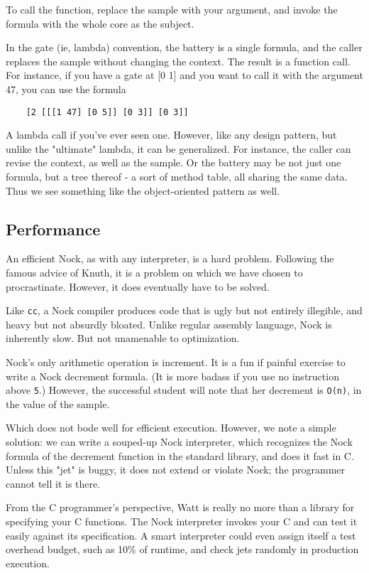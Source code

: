 \documentclass[10pt, nocopyrightspace]{sigplanconf}
\begin{document}
To call the function, replace the sample with your argument, and
invoke the formula with the whole core as the subject.

In the gate (ie, lambda) convention, the battery is a single
formula, and the caller replaces the sample without changing the
context.  The result is a function call.  For instance, if you
have a gate at [0 1] and you want to call it with the argument
47, you can use the formula
\begin{verbatim}
    [2 [[[1 47] [0 5]] [0 3]] [0 3]]
\end{verbatim}
A lambda call if you've ever seen one.  However, like any design
pattern, but unlike the "ultimate" lambda, it can be generalized.
For instance, the caller can revise the context, as well as the
sample.  Or the battery may be not just one formula, but a tree
thereof - a sort of method table, all sharing the same data.
Thus we see something like the object-oriented pattern as well.

\subsection{Performance}

An efficient Nock, as with any interpreter, is a hard problem.
Following the famous advice of Knuth, it is a problem on which
we have chosen to procrastinate.  However, it does eventually
have to be solved.

Like \verb|cc|, a Nock compiler produces code that is ugly but not
entirely illegible, and heavy but not absurdly bloated.  Unlike
regular assembly language, Nock is inherently slow.  But not
unamenable to optimization.

Nock's only arithmetic operation is increment.  It is a fun if
painful exercise to write a Nock decrement formula.  (It is more
badass if you use no instruction above \verb|5|.) However, the
successful student will note that her decrement is \verb|O(n)|, in the
value of the sample.

Which does not bode well for efficient execution.  However, we
note a simple solution: we can write a souped-up Nock
interpreter, which recognizes the Nock formula of the decrement
function in the standard library, and does it fast in C.  Unless
this "jet" is buggy, it does not extend or violate Nock; the 
programmer cannot tell it is there.  

From the C programmer's perspective, Watt is really no more than
a library for specifying your C functions.  The Nock interpreter
invokes your C and can test it easily against its specification.
A smart interpreter could even assign itself a test overhead
budget, such as 10\% of runtime, and check jets randomly in
production execution.
\end{document}

